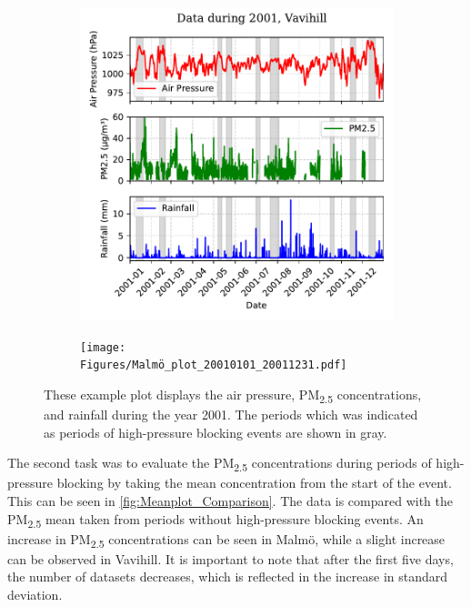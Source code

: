\begin{figure}[H]
    \centering
    \begin{subfigure}[b]{0.49\textwidth}
        \centering
        \includegraphics[width=\textwidth]{Figures/Vavihill_plot_20010101_20011231.pdf}
        \label{fig:2001Vavihill}
    \end{subfigure}
    \hfill
    \begin{subfigure}[b]{0.49\textwidth}
        \centering
        \texttt{[image: Figures/Malmö\_plot\_20010101\_20011231.pdf]}
        \label{fig:2001Malmö}
    \end{subfigure}
    \caption{These example plot displays the air pressure, PM\textsubscript{2.5} concentrations, and rainfall during the year 2001. The periods which was indicated as periods of high-pressure blocking events are shown in gray. }
    \label{fig:2001}
\end{figure}

The second task was to evaluate the PM\textsubscript{2.5} concentrations during periods of high-pressure blocking by taking the mean concentration from the start of the event. This can be seen in \autoref{fig:Meanplot_Comparison}. The data is compared with the PM\textsubscript{2.5} mean taken from periods without high-pressure blocking events. An increase in PM\textsubscript{2.5} concentrations can be seen in Malmö, while a slight increase can be observed in Vavihill. It is important to note that after the first five days, the number of datasets decreases, which is reflected in the increase in standard deviation.


